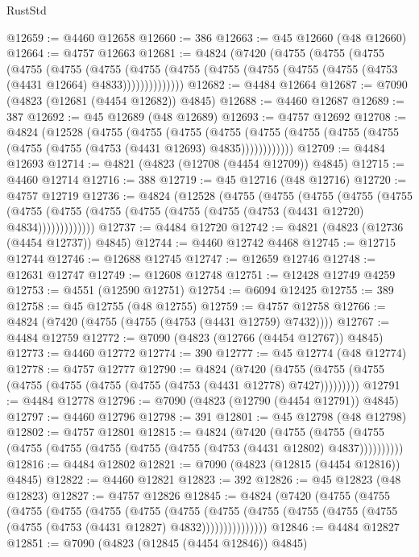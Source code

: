 \begin{lexlean}{RustStd}
\begin{coremodule}
@12659 := @4460 @12658
@12660 := 386
@12663 := @45 @12660 (@48 @12660)
@12664 := @4757 @12663
@12681 := @4824
    (@7420
      (@4755
        (@4755
          (@4755
            (@4755
              (@4755
                (@4755
                  (@4755
                    (@4755 (@4755 (@4755 (@4755 (@4755 (@4753 (@4431 @12664) @4833))))))))))))))
@12682 := @4484 @12664
@12687 := @7090 (@4823 (@12681 (@4454 @12682)) @4845)
@12688 := @4460 @12687
@12689 := 387
@12692 := @45 @12689 (@48 @12689)
@12693 := @4757 @12692
@12708 := @4824
    (@12528
      (@4755
        (@4755
          (@4755
            (@4755 (@4755 (@4755 (@4755 (@4755 (@4755 (@4755 (@4753 (@4431 @12693) @4835))))))))))))
@12709 := @4484 @12693
@12714 := @4821 (@4823 (@12708 (@4454 @12709)) @4845)
@12715 := @4460 @12714
@12716 := 388
@12719 := @45 @12716 (@48 @12716)
@12720 := @4757 @12719
@12736 := @4824
    (@12528
      (@4755
        (@4755
          (@4755
            (@4755
              (@4755
                (@4755 (@4755 (@4755 (@4755 (@4755 (@4755 (@4753 (@4431 @12720) @4834)))))))))))))
@12737 := @4484 @12720
@12742 := @4821 (@4823 (@12736 (@4454 @12737)) @4845)
@12744 := @4460 @12742 @4468
@12745 := @12715 @12744
@12746 := @12688 @12745
@12747 := @12659 @12746
@12748 := @12631 @12747
@12749 := @12608 @12748
@12751 := @12428 @12749 @4259
@12753 := @4551 (@12590 @12751)
@12754 := @6094 @12425
@12755 := 389
@12758 := @45 @12755 (@48 @12755)
@12759 := @4757 @12758
@12766 := @4824 (@7420 (@4755 (@4755 (@4753 (@4431 @12759) @7432))))
@12767 := @4484 @12759
@12772 := @7090 (@4823 (@12766 (@4454 @12767)) @4845)
@12773 := @4460 @12772
@12774 := 390
@12777 := @45 @12774 (@48 @12774)
@12778 := @4757 @12777
@12790 := @4824
    (@7420 (@4755 (@4755 (@4755 (@4755 (@4755 (@4755 (@4755 (@4753 (@4431 @12778) @7427)))))))))
@12791 := @4484 @12778
@12796 := @7090 (@4823 (@12790 (@4454 @12791)) @4845)
@12797 := @4460 @12796
@12798 := 391
@12801 := @45 @12798 (@48 @12798)
@12802 := @4757 @12801
@12815 := @4824
    (@7420
      (@4755 (@4755 (@4755 (@4755 (@4755 (@4755 (@4755 (@4755 (@4753 (@4431 @12802) @4837))))))))))
@12816 := @4484 @12802
@12821 := @7090 (@4823 (@12815 (@4454 @12816)) @4845)
@12822 := @4460 @12821
@12823 := 392
@12826 := @45 @12823 (@48 @12823)
@12827 := @4757 @12826
@12845 := @4824
    (@7420
      (@4755
        (@4755
          (@4755
            (@4755
              (@4755
                (@4755
                  (@4755
                    (@4755
                      (@4755 (@4755 (@4755 (@4755 (@4755 (@4753 (@4431 @12827) @4832)))))))))))))))
@12846 := @4484 @12827
@12851 := @7090 (@4823 (@12845 (@4454 @12846)) @4845)

\end{coremodule}
\end{lexlean}
